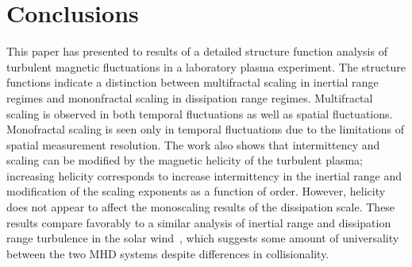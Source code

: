 \documentclass[aps,prl,amsmath,amssymb,reprint,superscriptaddress]{revtex4-1} %
\begin{document}
\section{Conclusions}\label{sec:conclusions}

This paper has presented to results of a detailed structure function analysis of turbulent magnetic fluctuations in a laboratory plasma experiment. The structure functions indicate a distinction between multifractal scaling in inertial range regimes and mononfractal scaling in dissipation range regimes. Multifractal scaling is observed in both temporal fluctuations as well as spatial fluctuations. Monofractal scaling is seen only in temporal fluctuations due to the limitations of spatial measurement resolution. The work also shows that intermittency and scaling can be modified by the magnetic helicity of the turbulent plasma; increasing helicity corresponds to increase intermittency in the inertial range and modification of the scaling exponents as a function of order. However, helicity does not appear to affect the monoscaling results of the dissipation scale. These results compare favorably to a similar analysis of inertial range and dissipation range turbulence in the solar wind~\cite{kiyani2013}, which suggests some amount of universality between the two MHD systems despite differences in collisionality.
\end{document}
